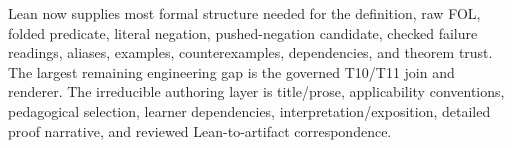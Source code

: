 \documentclass[10pt]{article}
\begin{document}
\par\medskip
\begin{tcolorbox}[colback=black!3,colframe=black!55,title=\textbf{Bottom line},boxrule=.6pt]
\small
Lean now supplies most formal structure needed for the definition, raw FOL,
folded predicate, literal negation, pushed-negation candidate, checked failure
readings, aliases, examples, counterexamples, dependencies, and theorem trust.
The largest remaining engineering gap is the governed T10/T11 join and renderer.
The irreducible authoring layer is title/prose, applicability conventions,
pedagogical selection, learner dependencies, interpretation/exposition,
detailed proof narrative, and reviewed Lean-to-artifact correspondence.
\end{tcolorbox}
\end{document}
